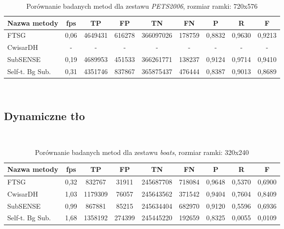 \begin{table}[!h]
\small
\caption{Porównanie badanych metod dla zestawu \textit{PETS2006}, rozmiar ramki: 720x576}
\label{tab:resultsPETS2006}
\centering
\begin{tabular*}{\textwidth}{@{\extracolsep{\fill}} |l*{8}{|c}|}
  \hline 
  \textbf{Nazwa metody} & \textbf{fps} & \textbf{TP} & \textbf{FP} & \textbf{TN} & \textbf{FN} & \textbf{P} & \textbf{R} & \textbf{F}\\
  \hline
  FTSG & 0,06 & 4649431 & 616278 & 366097026 & 178759 & 0,8832 & 0,9630 & 0,9213\\ 
\hline
CwisarDH & - & - & - & - & - & - & - & -\\ 
\hline
SubSENSE & 0,19 & 4689953 & 451533 & 366261771 & 138237 & 0,9124 & 0,9714 & 0,9410\\ 
\hline
Self-t. Bg Sub. & 0,31 & 4351746 & 837867 & 365875437 & 476444 & 0,8387 & 0,9013 & 0,8689\\ 
\hline
\end{tabular*}
\end{table}
~
\FloatBarrier
\subsection{Dynamiczne tło}
~
\FloatBarrier
\begin{table}[!htb]
\small
\caption{Porównanie badanych metod dla zestawu \textit{boats}, rozmiar ramki: 320x240}
\label{tab:resultsBoats}
\centering
\begin{tabular*}{\textwidth}{@{\extracolsep{\fill}} |l*{8}{|c}|}
  \hline 
  \textbf{Nazwa metody} & \textbf{fps} & \textbf{TP} & \textbf{FP} & \textbf{TN} & \textbf{FN} & \textbf{P} & \textbf{R} & \textbf{F}\\
  \hline
  FTSG & 0,32 & 832767 & 31911 & 245687708 & 718084 & 0,9648 & 0,5370 & 0,6900\\ 
\hline
CwisarDH & 1,03 & 1179309 & 76057 & 245643562 & 371542 & 0,9404 & 0,7604 & 0,8409\\ 
\hline
SubSENSE & 0,99 & 867881 & 85215 & 245634404 & 682970 & 0,9120 & 0,5596 & 0,6936\\ 
\hline
Self-t. Bg Sub. & 1,68 & 1358192 & 274399 & 245445220 & 192659 & 0,8325 & 0,0055 & 0,0109\\ 
\hline
\end{tabular*}
\end{table}

